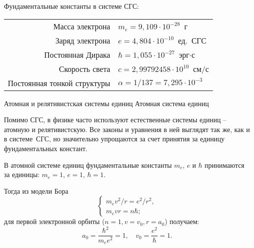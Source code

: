 \documentclass[10pt,a4paper]{extarticle}
\makeatletter
\renewcommand\section{\@startsection{section}{1}{\z@}{3ex}{3ex}
  {\normalfont\large\bfseries}}
\renewcommand\subsection{\@startsection{subsection}{2}{\z@}{2ex}{2ex}
  {\normalfont\normalsize\bfseries}}
\makeatother
\begin{document}
  Фундаментальные константы в системе СГС:
  \begin{table}[h!]
    \center
    \begin{tabular}{|r|l|} \hline
      Масса электрона & \( m_e = 9,\!109 \cdot 10^{-28} \)~г \\
      Заряд электрона & \( e = 4,\!804 \cdot 10^{-10} \)~ед.~СГС \\
      Постоянная Дирака & \( \hbar = 1,\!055 \cdot 10^{-27} \)~эрг\(\cdot\)с \\
      Скорость света & \( c = 2,\!99792458 \cdot 10^{10} \)~см/с \\
      Постоянная тонкой структуры\footnotemark[1] &
        \( \alpha = 1 / 137 = 7,\!295 \cdot 10^{-3} \) \\ \hline
    \end{tabular}
  \end{table}

  \section{Атомная и релятивистская системы единиц}
  \subsection{Атомная система единиц}

  Помимо СГС, в физике часто используют естественные системы единиц -- атомную и
  релятивистскую. Все законы и уравнения в ней выглядят так же, как и в
  системе~СГС, но значительно упрощаются за счет принятия за единицу
  фундаментальных констант.

  В атомной системе единиц фундаментальные константы \( m_e \), \( e \) и
  \( \hbar \) принимаются за единицы: \( m_e = 1 \), \( e = 1 \),
  \( \hbar = 1 \).

  Тогда из модели Бора
  \begin{equation}
    \left\{
      \begin{array}{l}
        m_e v^2 / r = e^2 / r^2, \\
        m_e vr = n\hbar;
      \end{array}
    \right.
    \label{Bohr_model}
  \end{equation}
  для первой электронной орбиты (\( n = 1, v = v_0, r = a_0 \)) получаем:
  \[
    a_0 = \frac{\hbar^2}{m_e e^2} = 1, \quad
      v_0 = \frac{e^2}{\hbar} = 1.
  \]
\end{document}
